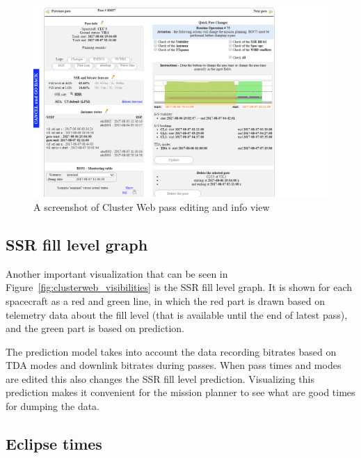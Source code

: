 \begin{figure}[ht]
  \begin{center}
    \includegraphics*[width=1\textwidth]{clusterweb_pass_edit}
  \end{center}
  \caption{A screenshot of Cluster Web pass editing and info view}
  \label{fig:clusterweb_pass_edit}
\end{figure}

\subsection{SSR fill level graph}
Another important visualization that can be seen in Figure~\ref{fig:clusterweb_visibilities} is the SSR fill level graph. It is shown for each spacecraft as a red and green line, in which the red part is drawn based on telemetry data about the fill level (that is available until the end of latest pass), and the green part is based on prediction. 

The prediction model takes into account the data recording bitrates based on TDA modes and downlink bitrates during passes. When pass times and modes are edited this also changes the SSR fill level prediction. Visualizing this prediction makes it convenient for the mission planner to see what are good times for dumping the data.

\subsection{Eclipse times}

